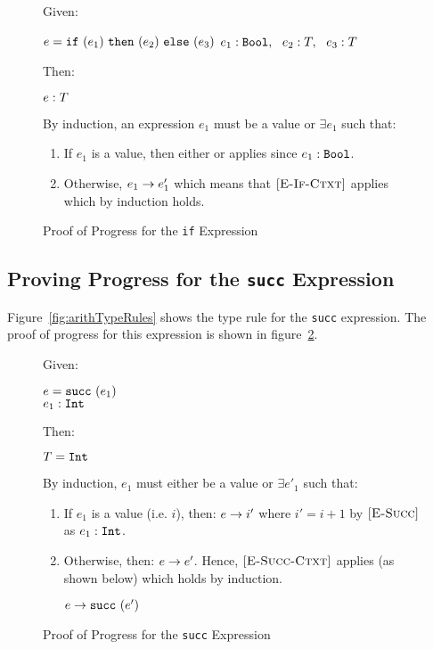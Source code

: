 \documentclass{report}
\newcommand{\rel}[1]{ \mbox{\sc [#1]} }
\begin{document}
\begin{figure}[ht!]
Given:
\begin{center}
   $e = \mbox{\tt if}~({e_1})~\mbox{\tt then}~({e_2})~\mbox{\tt else}~({e_3})$
   ${e_1} : {\mbox{\tt Bool}},~~{e_2} : {T},~~{e_3} : {T}$
\end{center}
Then:
\begin{center}
   ${e} : {T}$
\end{center}
By induction, an expression $e_1$ must be a value or $\exists e_1$ such that:
\begin{enumerate}

    \item If $e_1$ is a value, then either \rel{E-If-True} or \rel{E-If-False} applies since ${e_1} : {\mbox{\tt Bool}}$.
      
    \item Otherwise, ${e_1} \rightarrow {e'_1}$ which means that $\rel{E-If-Ctxt}$ applies which by induction holds.
	
	\end{enumerate}
	
  \caption{Proof of Progress for the \texttt{if} Expression}\label{fig:ifProofProgress}
\end{figure}

\eject
\subsection{Proving Progress for the \texttt{succ} Expression}

Figure~\ref{fig:arithTypeRules} shows the type rule for the \texttt{succ} expression.  The proof of progress for this expression is shown in figure~\ref{fig:succProofProgress}.

\begin{figure}[ht!]
Given:
\begin{center}
  $e = \mbox{\tt succ}~(e_1)$ \\
   ${e_1} : {\mbox{\tt Int}}$
\end{center}
Then:~\\
\begin{center}
   $T = \mbox{\tt Int}$
\end{center}

By induction, $e_1$ must either be a value or $\exists e'_1$ such that:~\\

	\begin{enumerate}
    \item If $e_1$ is a value (i.e. $i$), then: ${e} \rightarrow {i'}$ where $i' = i + 1$ by $\rel{E-Succ}$ as ${e_1} : {\mbox{\tt Int}}$.
      
    \item Otherwise, then: ${e} \rightarrow {e'}$.  Hence, $\rel{E-Succ-Ctxt}$ applies (as shown below) which holds by induction.
    
    \begin{center}
      ${e} \rightarrow {\mbox{\tt succ}~(e')}$
    \end{center}
	
	\end{enumerate}
	
  \caption{Proof of Progress for the \texttt{succ} Expression}\label{fig:succProofProgress}
\end{figure}
\end{document}

